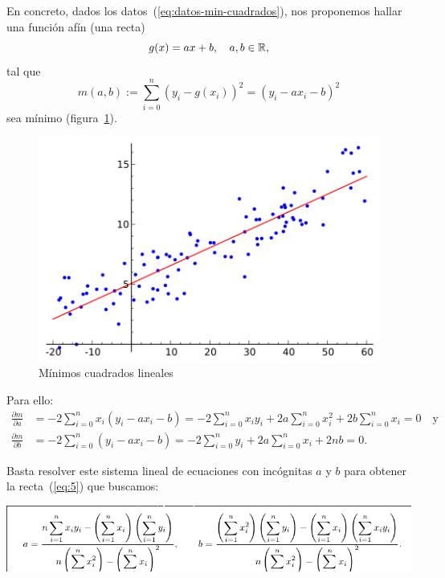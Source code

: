 En concreto, dados los datos~(\ref{eq:datos-min-cuadrados}), nos
proponemos hallar una función afín (una recta)
\begin{equation}
  g(x)=ax+b, \quad a,b\in\operatorname{{\mathbb R}},\label{eq:5}
\end{equation}
tal que
\begin{equation*}
  m(a,b) := \sum_{i=0}^n
  \left(
    y_i - g(x_i)
  \right)^2
  =
  \left(
    y_i - a x_i - b
  \right)^2
\end{equation*}
sea mínimo (figura~\ref{fig:min-cuadrados-lineales}).

\begin{figure}
  \centering
  \includegraphics[width=0.6\linewidth]{tema2/linear_regression}
  \caption{Mínimos cuadrados lineales}
  \label{fig:min-cuadrados-lineales}
\end{figure}

Para ello:
\begin{align*}
  \frac{\partial m}{\partial a} & =
                                  -2\sum_{i=0}^n
                                  x_i\left(
                                  y_i - a x_i - b
                                  \right) =
                                  -2\sum_{i=0}^n x_i y_i
                                  +2a\sum_{i=0}^n x_i^2
                                  +2b\sum_{i=0}^n x_i
                                  = 0
                                  \quad \text{y} \\
  \frac{\partial m}{\partial b} & =
                                  -2\sum_{i=0}^n
                                  \left(
                                  y_i - a x_i - b
                                  \right) =
                                  -2\sum_{i=0}^n  y_i
                                  +2a\sum_{i=0}^n x_i
                                  +2nb
                                  = 0.
\end{align*}

Basta resolver este sistema lineal de ecuaciones con incógnitas $a$ y
$b$ para obtener la recta~(\ref{eq:5}) que buscamos:
\begin{center}
  \includegraphics[width=0.9\linewidth]{tema2/ecuacion-min-cuadr}
\end{center}

